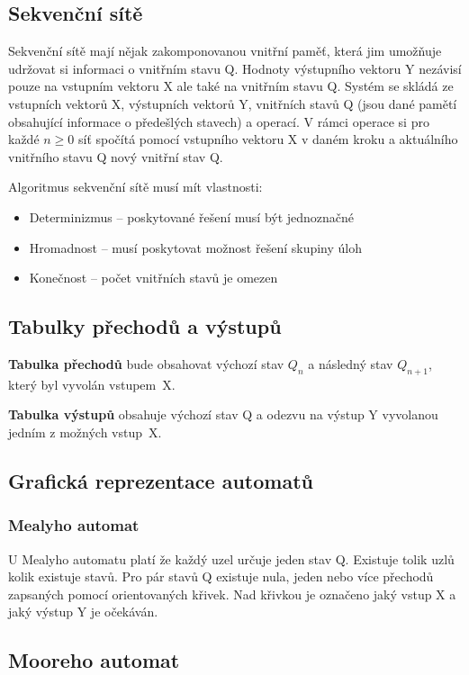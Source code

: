 \subsection{Sekvenční sítě}

Sekvenční sítě mají nějak zakomponovanou vnitřní paměť, která jim umožňuje udržovat si informaci o vnitřním stavu Q.
Hodnoty výstupního vektoru Y nezávisí pouze na vstupním vektoru X ale také na vnitřním stavu Q.
Systém se skládá ze vstupních vektorů X, výstupních vektorů Y, vnitřních stavů Q (jsou dané pamětí obsahující informace o předešlých stavech) a operací.
V rámci operace si pro každé $n\ge0$ síť spočítá pomocí vstupního vektoru X v daném kroku a aktuálního vnitřního stavu Q nový vnitřní stav Q.

Algoritmus sekvenční sítě musí mít vlastnosti:
\begin{itemize}[noitemsep]
    \item Determinizmus -- poskytované řešení musí být jednoznačné
    \item Hromadnost -- musí poskytovat možnost řešení skupiny úloh
    \item Konečnost -- počet vnitřních stavů je omezen
\end{itemize}

\subsection{Tabulky přechodů a výstupů}
\textbf{Tabulka přechodů} bude obsahovat výchozí stav $Q_n$ a následný stav $Q_{n+1}$, který byl vyvolán vstupem~X.

\textbf{Tabulka výstupů}  obsahuje výchozí stav Q a odezvu na výstup Y vyvolanou jedním z možných vstup~X.

\subsection{Grafická reprezentace automatů}

\subsubsection{Mealyho automat}

U Mealyho automatu platí že každý uzel určuje jeden stav Q.
Existuje tolik uzlů kolik existuje stavů.
Pro pár stavů Q existuje nula, jeden nebo více přechodů zapsaných pomocí orientovaných křivek.
Nad křivkou je označeno jaký vstup X a jaký výstup Y je očekáván.

\subsection{Mooreho automat}

